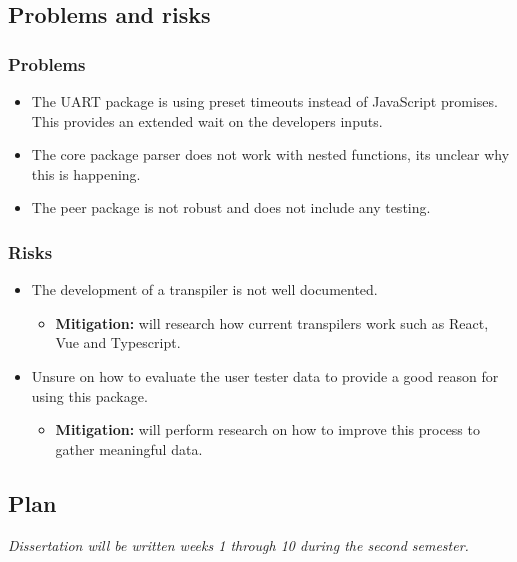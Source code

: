 \documentclass[11pt]{article}
\begin{document}
\subsection{Problems and risks}\label{problems-and-risks}

\subsubsection{Problems}\label{problems}

\begin{itemize}
    \item The UART package is using preset timeouts instead of JavaScript promises. This provides an extended wait on the developers inputs.
    \item The core package parser does not work with nested functions, its unclear why this is happening.
    \item The peer package is not robust and does not include any testing.
\end{itemize}

\subsubsection{Risks}\label{risks}

\begin{itemize}
    \item The development of a transpiler is not well documented. 
    \begin{itemize}
        \item \textbf{Mitigation:} will research how current transpilers work such as React, Vue and Typescript.
    \end{itemize}
    \item Unsure on how to evaluate the user tester data to provide a good reason for using this package. 
    \begin{itemize}
        \item \textbf{Mitigation:} will perform research on how to improve this process to gather meaningful data.
    \end{itemize}
\end{itemize}

\subsection{Plan}\label{plan}

\item \textit{Dissertation will be written weeks 1 through 10 during the second semester.}
\end{document}
